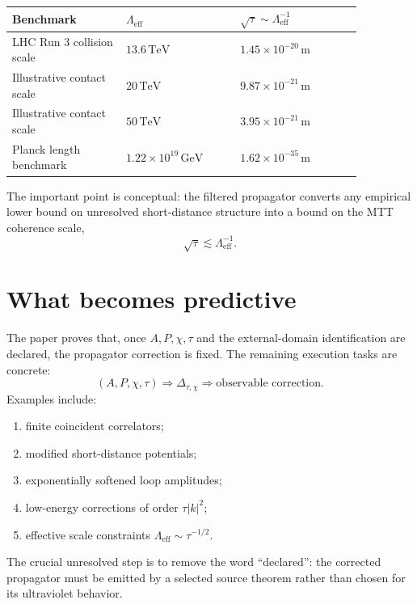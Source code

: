 \documentclass[11pt]{article}
\begin{document}
\begin{center}
\begin{tabular}{p{0.28\linewidth}p{0.28\linewidth}p{0.30\linewidth}}
\toprule
Benchmark & \(\Lambda_{\mathrm{eff}}\) & \(\sqrt{\tau}\sim \Lambda_{\mathrm{eff}}^{-1}\) \\
\midrule
LHC Run 3 collision scale & \(13.6\,\mathrm{TeV}\) & \(1.45\times10^{-20}\,\mathrm{m}\) \\
Illustrative contact scale & \(20\,\mathrm{TeV}\) & \(9.87\times10^{-21}\,\mathrm{m}\) \\
Illustrative contact scale & \(50\,\mathrm{TeV}\) & \(3.95\times10^{-21}\,\mathrm{m}\) \\
Planck length benchmark & \(1.22\times10^{19}\,\mathrm{GeV}\) & \(1.62\times10^{-35}\,\mathrm{m}\) \\
\bottomrule
\end{tabular}
\end{center}

The important point is conceptual: the filtered propagator converts any empirical lower bound on unresolved short-distance structure into a bound on the MTT coherence scale,
\[
        \sqrt{\tau}\lesssim \Lambda_{\mathrm{eff}}^{-1}.
\]


\section{What becomes predictive}

The paper proves that, once \(A,P,\chi,\tau\) and the external-domain identification are
declared, the propagator correction is fixed.  The remaining execution tasks are concrete:
\[
        (A,P,\chi,\tau)
        \Longrightarrow
        \Delta_{\tau,\chi}
        \Longrightarrow
        \text{observable correction}.
\]
Examples include:
\begin{enumerate}
\item finite coincident correlators;
\item modified short-distance potentials;
\item exponentially softened loop amplitudes;
\item low-energy corrections of order \(\tau |k|^2\);
\item effective scale constraints \(\Lambda_{\mathrm{eff}}\sim\tau^{-1/2}\).
\end{enumerate}

The crucial unresolved step is to remove the word ``declared'': the corrected propagator must
be emitted by a selected source theorem rather than chosen for its ultraviolet behavior.
\end{document}
